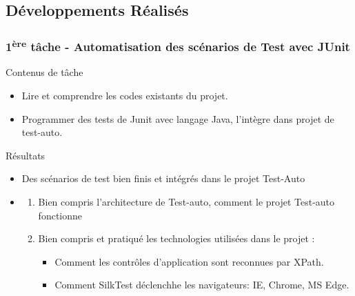 \documentclass{beamer}
\begin{document}
        \subsection{Développements Réalisés}
        \begin{frame}
            \frametitle{1\textsuperscript{ère} tâche - Automatisation des scénarios de Test avec JUnit}
            \begin{block}{Contenus de tâche}
                \begin{itemize}
                    \item Lire et comprendre les codes existants du projet.
                    \item Programmer des tests de Junit avec langage Java, l'intègre dans projet de test-auto.
                \end{itemize}
            \end{block}
            
            \pause
            \begin{block}{Résultats}
                \begin{itemize}
                    \item Des scénarios de test bien finis et intégrés dans le projet Test-Auto
                    \item \begin{enumerate}
                        \item Bien compris l'architecture de Test-auto, comment le projet Test-auto fonctionne
                        \item Bien compris et pratiqué les technologies utilisées dans le projet : 
                            \begin{itemize}
                                \item Comment les contrôles d'application sont reconnues par XPath.
                                \item Comment SilkTest déclenchhe les navigateurs: IE, Chrome, MS Edge.
                            \end{itemize}
                    \end{enumerate}
                \end{itemize}
            \end{block}
        \end{frame}
        
\end{document}
